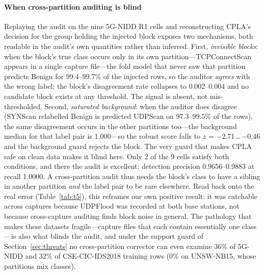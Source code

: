\documentclass[preprint,12pt]{elsarticle}
\begin{document}
\paragraph{When cross-partition auditing is blind} Replaying the audit on the
nine 5G-NIDD R1 cells and reconstructing CPLA's decision for the group holding
the injected block exposes two mechanisms, both readable in the audit's own
quantities rather than inferred. First, \emph{invisible blocks}: when the
block's true class occurs only in its own partition---TCPConnectScan appears in
a single capture file---the fold model that never saw that partition predicts
Benign for 99.4--99.7\% of the injected rows, so the auditor \emph{agrees} with
the wrong label; the block's disagreement rate collapses to 0.002--0.004 and no
candidate block exists at any threshold. The signal is absent, not
mis-thresholded. Second, \emph{saturated background}: when the auditor does
disagree (SYNScan relabelled Benign is predicted UDPScan on 97.3--99.5\% of the
rows), the same disagreement occurs in the other partitions too---the background
median for that label pair is 1.000---so the robust score falls to $z$ =
$-$2.71\,\ldots\,$-$0.46 and the background guard rejects the block. The very
guard that makes CPLA safe on clean data makes it blind here. Only 2 of the 9
cells satisfy both conditions, and there the audit is excellent: detection
precision 0.9656--0.9883 at recall 1.0000. A cross-partition audit thus needs
the block's class to have a sibling in another partition \emph{and} the label
pair to be rare elsewhere. Read back onto the real error
(Table~\ref{tab:t5}), this reframes our own positive result: it was catchable across
captures because UDPFlood was recorded at both base stations, not because
cross-capture auditing finds block noise in general. The pathology that makes
these datasets fragile---capture files that each contain essentially one
class---is also what blinds the audit, and under the support guard of
Section~\ref{sec:threats} no cross-partition corrector can even examine 36\% of
5G-NIDD and 32\% of CSE-CIC-IDS2018 training rows (0\% on UNSW-NB15, whose
partitions mix classes).

\begin{table}[t]
\centering
\caption{Cross-partition auditing used as a \emph{corrector} (pre-registered;
3 datasets $\times$ 2 block-noise regimes $\times$ 3 block sizes $\times$ 3
seeds, plus 9 clean controls). Left: damage each corrector does on data with no
injected errors. Right: median fraction of the drop oracle's gain recovered on
the 13 cells with measurable damage, and the paired comparison against CPLA
(positive $\Delta$F1 favours CPLA; $p$ from a one-sided Wilcoxon signed-rank
test). The pre-registered gate---dominance over every comparator, recovery
$\geq 0.50$, harmlessness within 0.005---was not met.}
\label{tab:t10}
\footnotesize
\setlength{\tabcolsep}{3pt}

\end{table}
\end{document}
